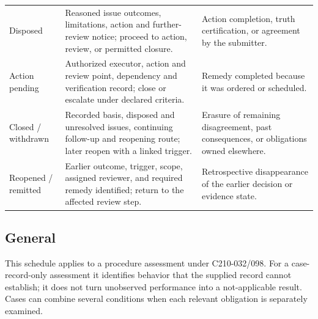 \documentclass[11pt,a4paper]{article}
\begin{document}
\begin{longtable}{@{}L{0.19\textwidth}L{0.37\textwidth}L{0.34\textwidth}@{}}
Disposed & Reasoned issue outcomes, limitations, action and further-review notice; proceed to action, review, or permitted closure. & Action completion, truth certification, or agreement by the submitter. \\
Action pending & Authorized executor, action and review point, dependency and verification record; close or escalate under declared criteria. & Remedy completed because it was ordered or scheduled. \\
Closed / withdrawn & Recorded basis, disposed and unresolved issues, continuing follow-up and reopening route; later reopen with a linked trigger. & Erasure of remaining disagreement, past consequences, or obligations owned elsewhere. \\
Reopened / remitted & Earlier outcome, trigger, scope, assigned reviewer, and required remedy identified; return to the affected review step. & Retrospective disappearance of the earlier decision or evidence state. \\
\bottomrule
\end{longtable}

\subsection{General}
This schedule applies to a procedure assessment under C210-032/098. For a case-record-only assessment it identifies behavior that the supplied record cannot establish; it does not turn unobserved performance into a not-applicable result. Cases can combine several conditions when each relevant obligation is separately examined.

\end{document}

